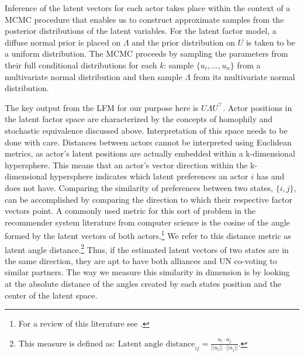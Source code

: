 Inference of the latent vectors for each actor takes place within the context of a MCMC procedure that enables us to construct approximate samples from the posterior distributions of the latent variables. For the latent factor model, a diffuse normal prior is placed on $\Lambda$ and the prior distribution on $U$ is taken to be a uniform distribution. The MCMC proceeds by sampling the parameters from their full conditional distributions for each $k$: sample $\{u_{i}, \ldots, u_{n}\}$ from a multivariate normal distribution and then sample $\Lambda$ from its multivariate normal distribution.

The key output from the LFM for our purpose here is $U \Lambda U^{\top}$. Actor positions in the latent factor space are characterized by the concepts of homophily and stochastic equivalence  discussed above. Interpretation of this space needs to be done with care. Distances between actors cannot be interpreted using Euclidean metrics, as actor's latent positions are actually embedded within a k-dimensional hypersphere. This means that an actor's vector direction within the k-dimensional hypersphere indicates which latent preferences an actor $i$ has and does not have. Comparing the similarity of preferences between two states, $\{i,j\}$, can be accomplished by comparing the direction to which their respective factor vectors point. A commonly used metric for this sort of problem in the recommender system literature from computer science is the cosine of the angle formed by the latent vectors of both actors.\footnote{For a review of this literature see \citep{amatriain:etal:2015}.} We refer to this distance metric as latent angle distance.\footnote{This measure is defined as: $\text{Latent angle distance}_{ij} = \frac{u_{i} \cdot u_{j}}{||u_{i}|| \cdot ||u_{j}||}$.} Thus, if the estimated latent vectors of two states are in the same direction, they are apt to have both alliances and UN co-voting to similar partners. The way we measure this similarity in dimension is by looking at the absolute distance of the angles created by each states position and the center of the latent space. 
